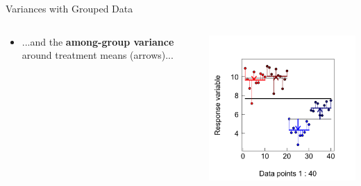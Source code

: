 \documentclass{beamer}
\begin{document}
\begin{frame}{Variances with Grouped Data}
  \begin{columns}[onlytextwidth] %
    \begin{column}{0.54\textwidth}
  \begin{itemize}
    \item ...and the \textbf{among-group variance} around treatment means (arrows)...
  \end{itemize}    \end{column}
    \hspace{0.02\textwidth} %
    \begin{column}{0.46\textwidth}
      \begin{center}
        \includegraphics[width=0.999\textwidth]{lectures/day_1_intro_to_mems/figures/unnamed-chunk-33-1.png}
      \end{center}
    \end{column}
  \end{columns}
\end{frame}
\end{document}
